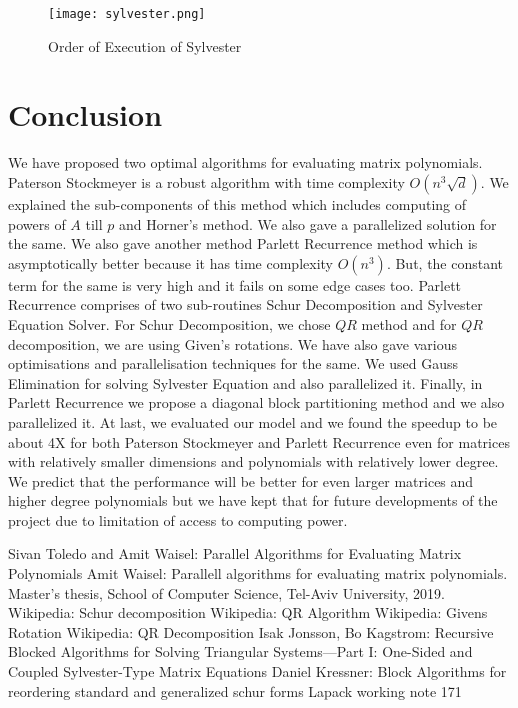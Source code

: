 \documentclass[12pt,a4paper]{article}
\begin{document}
\begin{figure}[h]
    \centering
    \texttt{[image: sylvester.png]}
    \caption{Order of Execution of Sylvester}
\end{figure}


\newpage     
\section{Conclusion}

We have proposed two optimal algorithms for evaluating matrix polynomials. Paterson Stockmeyer is a robust algorithm with time complexity $O(n^3\sqrt{d})$. We explained the sub-components of this method which includes computing of powers of $A$ till $p$ and Horner's method. We also gave a parallelized solution for the same. We also gave another method Parlett Recurrence method which is asymptotically better because it has time complexity $O(n^3)$. But, the constant term for the same is very high and it fails on some edge cases too. Parlett Recurrence comprises of two sub-routines Schur Decomposition and Sylvester Equation Solver. For Schur Decomposition, we chose $QR$ method and for $QR$ decomposition, we are using Given's rotations. We have also gave various optimisations and parallelisation techniques for the same. We used Gauss Elimination for solving Sylvester Equation and also parallelized it. Finally, in Parlett Recurrence we propose a diagonal block partitioning method and we also parallelized it. At last, we evaluated our model and we found the speedup to be about 4X for both Paterson Stockmeyer and Parlett Recurrence even for matrices with relatively smaller dimensions and polynomials with relatively lower degree. We predict that the performance will be better for even larger matrices and higher degree polynomials but we have kept that for future developments of the project due to limitation of access to computing power.


\newpage




\begin{thebibliography}{9}
Sivan Toledo and Amit Waisel: Parallel Algorithms for Evaluating Matrix Polynomials
Amit Waisel: Parallell algorithms for evaluating matrix polynomials. Master’s
thesis, School of Computer Science, Tel-Aviv University, 2019.
Wikipedia: Schur decomposition
Wikipedia: QR Algorithm
Wikipedia: Givens Rotation
Wikipedia: QR Decomposition
Isak Jonsson, Bo Kagstrom: Recursive Blocked Algorithms for Solving Triangular Systems—Part I: One-Sided and Coupled Sylvester-Type Matrix Equations
Daniel Kressner: Block Algorithms for reordering standard and generalized schur forms Lapack working note 171

\end{thebibliography}
\end{document}
